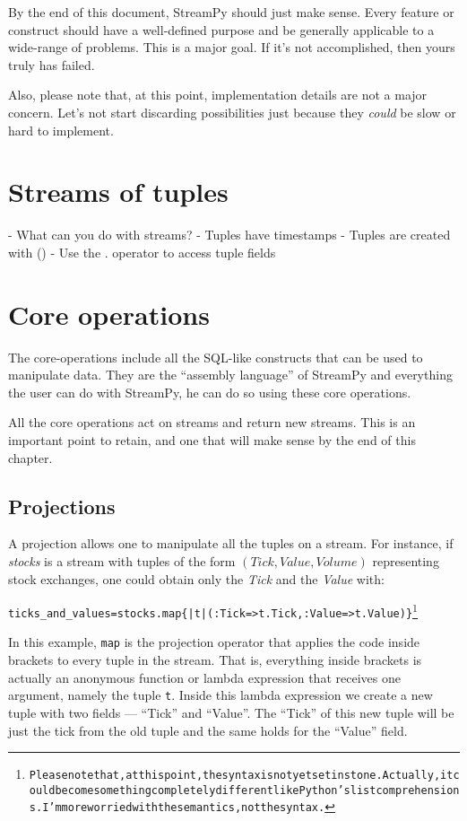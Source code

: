 \documentclass[twoside]{report}
\newcommand{\tuple}[1]{$(#1)$}
\begin{document}
By the end of this document, StreamPy should just make sense. Every feature or construct should have a well-defined purpose and be generally applicable to a wide-range of problems. This is a major goal. If it's not accomplished, then yours truly has failed.

Also, please note that, at this point, implementation details are not a major concern. Let's not start discarding possibilities just because they \emph{could} be slow or hard to implement.

\chapter{Streams of tuples}
- What can you do with streams?
- Tuples have timestamps
- Tuples are created with ()
- Use the . operator to access tuple fields

\chapter{Core operations}
The core-operations include all the SQL-like constructs that can be used to manipulate data. They are the ``assembly language'' of StreamPy and everything the user can do with StreamPy, he can do so using these core operations.

All the core operations act on streams and return new streams. This is an important point to retain, and one that will make sense by the end of this chapter.

\section{Projections}
A projection allows one to manipulate all the tuples on a stream. For instance, if \emph{stocks} is a stream with tuples of the form \tuple{Tick, Value, Volume} representing stock exchanges, one could obtain only the \emph{Tick} and the \emph{Value} with:
\begin{alltt}
  ticks_and_values = stocks.map \{ |t| (:Tick => t.Tick, :Value => t.Value) \}\footnote{Please note that, at this point, the syntax is not yet set in stone. Actually, it could become something completely different like Python's list comprehensions. I'm more worried with the semantics, not the syntax.}
\end{alltt}
In this example, \verb=map= is the projection operator that applies the code inside brackets to every tuple in the stream. That is, everything inside brackets is actually an anonymous function or lambda expression that receives one argument, namely the tuple \verb=t=. Inside this lambda expression we create a new tuple with two fields --- ``Tick'' and ``Value''. The ``Tick'' of this new tuple will be just the tick from the old tuple and the same holds for the ``Value'' field.
\end{document}
